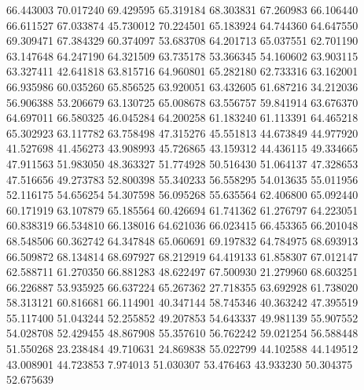66.443003
70.017240
69.429595
65.319184
68.303831
67.260983
66.106440
66.611527
67.033874
45.730012
70.224501
65.183924
64.744360
64.647550
69.309471
67.384329
60.374097
53.683708
64.201713
65.037551
62.701190
63.147648
64.247190
64.321509
63.735178
53.366345
54.160602
63.903115
63.327411
42.641818
63.815716
64.960801
65.282180
62.733316
63.162001
66.935986
60.035260
65.856525
63.920051
63.432605
61.687216
34.212036
56.906388
53.206679
63.130725
65.008678
63.556757
59.841914
63.676370
64.697011
66.580325
46.045284
64.200258
61.183240
61.113391
64.465218
65.302923
63.117782
63.758498
47.315276
45.551813
44.673849
44.977920
41.527698
41.456273
43.908993
45.726865
43.159312
44.436115
49.334665
47.911563
51.983050
48.363327
51.774928
50.516430
51.064137
47.328653
47.516656
49.273783
52.800398
55.340233
56.558295
54.013635
55.011956
52.116175
54.656254
54.307598
56.095268
55.635564
62.406800
65.092440
60.171919
63.107879
65.185564
60.426694
61.741362
61.276797
64.223051
60.838319
66.534810
66.138016
64.621036
66.023415
66.453365
66.201048
68.548506
60.362742
64.347848
65.060691
69.197832
64.784975
68.693913
66.509872
68.134814
68.697927
68.212919
64.419133
61.858307
67.012147
62.588711
61.270350
66.881283
48.622497
67.500930
21.279960
68.603251
66.226887
53.935925
66.637224
65.267362
27.718355
63.692928
61.738020
58.313121
60.816681
66.114901
40.347144
58.745346
40.363242
47.395519
55.117400
51.043244
52.255852
49.207853
54.643337
49.981139
55.907552
54.028708
52.429455
48.867908
55.357610
56.762242
59.021254
56.588448
51.550268
23.238484
49.710631
24.869838
55.022799
44.102588
44.149512
43.008901
44.723853
7.974013
51.030307
53.476463
43.933230
50.304375
52.675639
